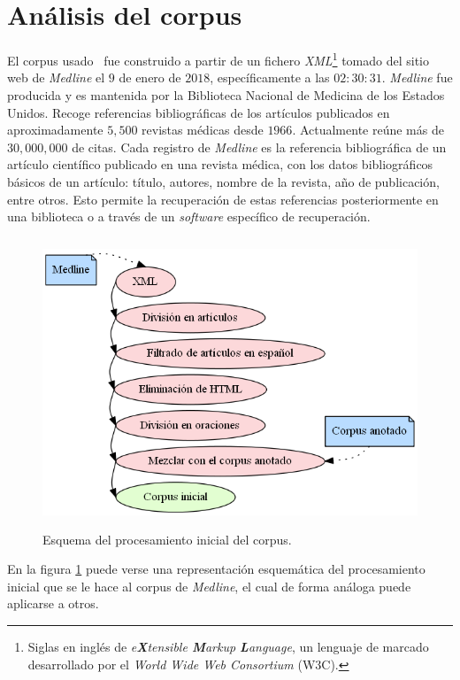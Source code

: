 \section{Análisis del corpus}
El corpus usado~\cite{ref:20} fue construido a partir de un fichero \textit{XML}\footnote{Siglas en inglés de \textit{e\textbf{X}tensible \textbf{M}arkup \textbf{L}anguage}, un lenguaje de marcado desarrollado por el \textit{World Wide Web Consortium} (W3C).} tomado del sitio web de \textit{Medline} el $9$ de enero de $2018$, específicamente a las $02:30:31$. \textit{Medline} fue producida y es mantenida por la Biblioteca Nacional de Medicina de los Estados Unidos. Recoge referencias bibliográficas de los artículos publicados en aproximadamente $5,500$ revistas médicas desde $1966$. Actualmente reúne más de $30,000,000$ de citas. Cada registro de \textit{Medline} es la referencia bibliográfica de un artículo científico publicado en una revista médica, con los datos bibliográficos básicos de un artículo: título, autores, nombre de la revista, año de publicación, entre otros. Esto permite la recuperación de estas referencias posteriormente en una biblioteca o a través de un \textit{software} específico de recuperación.

\begin{figure}[H]
	\begin{center}
		\includegraphics[height=3.4in]{graphics/corpus_processing.png}
		\caption[Esquema del procesamiento inicial del corpus]{Esquema del procesamiento inicial del corpus.}
		\label{fig:corpus_processing}
	\end{center}
\end{figure}

\vspace{-0.2in}
En la figura \ref{fig:corpus_processing} puede verse una representación esquemática del procesamiento inicial que se le hace al corpus de \textit{Medline}, el cual de forma análoga puede aplicarse a otros.